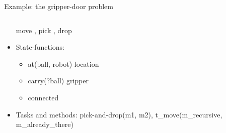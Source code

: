 \begin{frame}[c,fragile]{Example: the gripper-door problem}
\begin{columns}[T]
\begin{column}
\begin{itemize}
                 move
                , pick
                 , drop
                \item State-functions:
                    \begin{itemize}
                        \item at({ball, robot}) location
                        \item carry(?ball) gripper
                        \item connected
                    \end{itemize}
                \item Tasks and methods: pick-and-drop(m1, m2), t\_move(m\_recursive, m\_already\_there)   
            \end{itemize}
        \end{column}
        
    \end{columns} 
    \end{frame}

